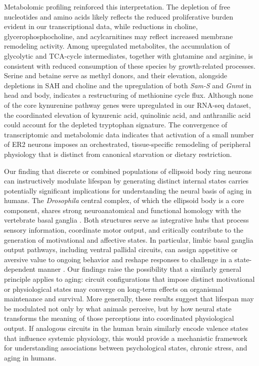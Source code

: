 Metabolomic profiling reinforced this interpretation.
The depletion of free nucleotides and amino acids likely reflects the reduced proliferative burden evident in our transcriptional data, while reductions in choline, glycerophosphocholine, and acylcarnitines may reflect increased membrane remodeling activity.
Among upregulated metabolites, the accumulation of glycolytic and TCA-cycle intermediates, together with glutamine and arginine, is consistent with reduced consumption of these species by growth-related processes.
Serine and betaine serve as methyl donors, and their elevation, alongside depletions in SAH and choline and the upregulation of both \textit{Sam-S} and \textit{Gnmt} in head and body, indicates a restructuring of methionine cycle flux.
Although none of the core kynurenine pathway genes were upregulated in our RNA-seq dataset, the coordinated elevation of kynurenic acid, quinolinic acid, and anthranilic acid could account for the depleted tryptophan signature.
The convergence of transcriptomic and metabolomic data indicates that activation of a small number of ER2 neurons imposes an orchestrated, tissue-specific remodeling of peripheral physiology that is distinct from canonical starvation or dietary restriction.

Our finding that discrete or combined populations of ellipsoid body ring neurons can instructively modulate lifespan by generating distinct internal states carries potentially significant implications for understanding the neural basis of aging in humans.
The \textit{Drosophila} central complex, of which the ellipsoid body is a core component, shares strong neuroanatomical and functional homology with the vertebrate basal ganglia \citep{strausfeld2013}.
Both structures serve as integrative hubs that process sensory information, coordinate motor output, and critically contribute to the generation of motivational and affective states.
In particular, limbic basal ganglia output pathways, including ventral pallidal circuits, can assign appetitive or aversive value to ongoing behavior and reshape responses to challenge in a state-dependent manner \citep{stephenson-jones2020}.
Our findings raise the possibility that a similarly general principle applies to aging: circuit configurations that impose distinct motivational or physiological states may converge on long-term effects on organismal maintenance and survival.
More generally, these results suggest that lifespan may be modulated not only by what animals perceive, but by how neural state transforms the meaning of those perceptions into coordinated physiological output.
If analogous circuits in the human brain similarly encode valence states that influence systemic physiology, this would provide a mechanistic framework for understanding associations between psychological states, chronic stress, and aging in humans.
